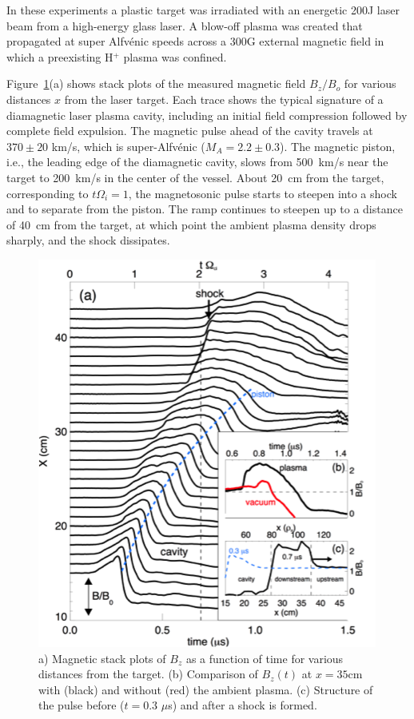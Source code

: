 \documentclass[11pt]{article}
\begin{document}
In these experiments a plastic target was irradiated with an energetic
200J laser beam from a high-energy glass laser. A blow-off plasma
was created that propagated at super Alfv\'{e}nic speeds across a 300G
external magnetic field in which a preexisting H$^+$ plasma was confined.


Figure~\ref{shock1}(a) shows stack plots of the measured magnetic field
$B_z/B_o$ for various
distances $x$ from the laser target. Each trace shows the typical
signature of a diamagnetic laser plasma cavity, including an initial
field compression followed by complete field expulsion. The magnetic
pulse ahead of the cavity travels at $370 \pm 20$ km/s, which is
super-Alfv\'{e}nic ($M_A = 2.2 \pm 0.3$). The magnetic
piston, i.e., the leading edge of the diamagnetic cavity, slows from
500~km/s near the target to 200~km/s in the center of the vessel. About 20~cm from the target, corresponding to
$t \Omega_{i} =1$, the magnetosonic pulse starts to
steepen into a shock and to separate from the piston. The ramp continues
to steepen up to a distance of 40~cm from the target, at which point the
ambient plasma density drops sharply, and the shock dissipates. 
\begin{figure}
\begin{center}
\includegraphics[width=3.2truein]{shock1}
\caption{a) Magnetic stack plots of $B_{z}$ as a function of time for
  various distances from the target. (b) Comparison of $B_z(t)$ at $x
  = 35$cm with (black) and without (red) the ambient plasma. (c) Structure
  of the pulse before ($t = 0.3$ $\mu$s) and after a shock is formed.}\label{shock1}
\end{center}
\end{figure}
\end{document}
